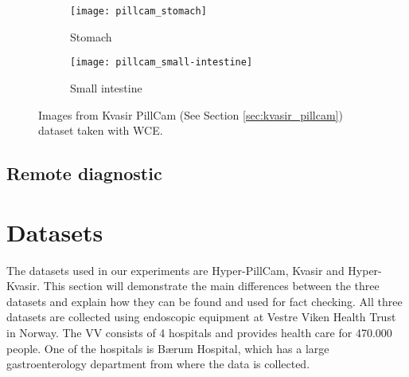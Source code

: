 \documentclass[thesis.tex]{subfiles}
\begin{document}
\begin{figure} %
  \centering
  \begin{subfigure}[b]{0.4\linewidth}
    \centering
    \texttt{[image: pillcam\_stomach]}
    \caption{Stomach}
    \label{fig:pillcam_stomach}
  \end{subfigure}
  \quad
  \begin{subfigure}[b]{0.4\linewidth}
    \centering
    \texttt{[image: pillcam\_small-intestine]}
    \caption{Small intestine}
    \label{fig:pillcam_colon}
  \end{subfigure}
  \caption[Images taken with WCE]{Images from Kvasir PillCam (See Section \ref{sec:kvasir_pillcam}) dataset taken with WCE.}
  \label{fig:pillcam_examples}
\end{figure}



\subsection{Remote diagnostic}  \label{sec:remote_diagnostic}






\section{Datasets} \label{sec:available_datasets}

The datasets used in our experiments are Hyper-PillCam, Kvasir and Hyper-Kvasir. This section will demonstrate the main differences between the three datasets and explain how they can be found and used for fact checking. All three datasets are collected using endoscopic equipment at Vestre Viken Health Trust in Norway. The VV consists of 4 hospitals and provides health care for 470.000 people. One of the hospitals is Bærum Hospital, which has a large gastroenterology department from where the data is collected.
\end{document}
